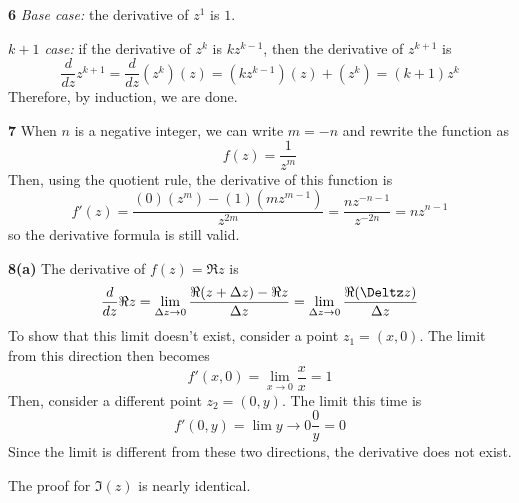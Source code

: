 \documentclass{article}
\begin{document}
\textbf{6}
\textit{Base case:} the derivative of $z^1$ is $1$.

\textit{$k+1$ case:} if the derivative of $z^k$ is $kz^{k-1}$, then the derivative of $z^{k+1}$ is
\[
	\frac{d}{dz} z^{k+1} 
	= \frac{d}{dz} (z^k)(z) 
	= (kz^{k-1})(z) + (z^k)
	= (k+1)z^k
\]
Therefore, by induction, we are done.

\textbf{7}
When $n$ is a negative integer, we can write $m = -n$ and rewrite the function as
\[
	f(z) = \frac{1}{z^m}
\]
Then, using the quotient rule, the derivative of this function is
\[
	f'(z)
	= \frac{(0)(z^m) - (1)(mz^{m-1})}{z^{2m}}
	= \frac{nz^{-n-1}}{z^{-2n}}
	= nz^{n-1}
\]
so the derivative formula is still valid.	

\textbf{8(a)}
The derivative of $f(z) = \Re z$ is
\[
	\frac{d}{dz} \Re z 
	= \lim_{\Delta z \to 0} \frac{\Re(z + \Delta z) - \Re z}{\Delta z}
	= \lim_{\Delta z \to 0} \frac{\Re (\Deltz z)}{\Delta z}
\]
To show that this limit doesn't exist, consider a point $z_1 = (x,0)$. The limit from this direction then becomes
\[
	f'(x, 0) = \lim_{x \to 0} \frac{x}{x} 
	= 1
\]
Then, consider a different point $z_2 = (0, y)$. The limit this time is
\[
	f'(0, y) = \lim{y \to 0} \frac{0}{y} = 0
\]
Since the limit is different from these two directions, the derivative does not exist.

The proof for $\Im (z)$ is nearly identical.
\end{document}
